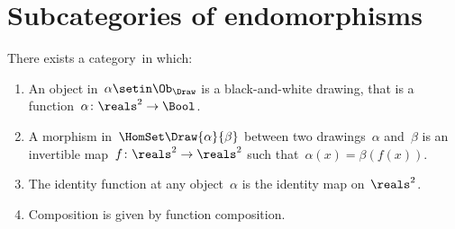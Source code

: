 
\section{Subcategories of endomorphisms}
\label{sec:Draw}


\index{\Draw}
\begin{definition}[Drawings]
    \label{def:Draw}
    There exists a category~\Draw in which:
    \begin{enumerate}
        \item An object in~$\alpha\setin \Ob_\Draw$ is a black-and-white drawing,
              that is a function~$\alpha \colon \reals^2 \to \Bool$.
        \item A morphism in~$\HomSet\Draw{\alpha}{\beta}$ between two drawings~$\alpha$ and~$\beta$ is an invertible map~$f\colon \reals^2 \to \reals^2$ such that~$\alpha(x) = \beta(f(x))$.
        \item The identity function at any object~$\alpha$ is the identity map on~$\reals^2$.
        \item Composition is given by function composition.
    \end{enumerate}
\end{definition}

